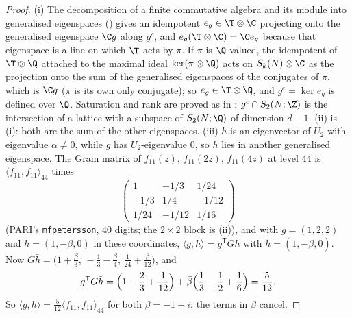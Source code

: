 \begin{proof}
(i) The decomposition of a finite commutative algebra and its module into generalised eigenspaces () gives an idempotent $e_g\in\T\otimes\C$ projecting onto the
generalised eigenspace $\C g$ along $g^c$, and $e_g(\T\otimes\C)=\C e_g$ because that eigenspace is a line on which $\T$ acts by $\pi$. If $\pi$ is $\Q$-valued, the idempotent of $\T\otimes\Q$
attached to the maximal ideal $\ker(\pi\otimes\Q)$ acts on $S_k(N)\otimes\C$ as the projection onto the sum of the generalised eigenspaces of the conjugates of $\pi$, which is $\C g$ ($\pi$
is its own only conjugate); so $e_g\in\T\otimes\Q$, and $g^c=\ker e_g$ is defined over $\Q$. Saturation and rank are proved as in : $g^c\cap S_2(N;\Z)$ is the
intersection of a lattice with a subspace of $S_2(N;\Q)$ of dimension $d-1$. (ii) is
(i): both are the sum of the other eigenspaces. (iii) $h$ is an eigenvector of $U_2$ with eigenvalue $\alpha\ne0$, while $g$ has $U_2$-eigenvalue $0$, so $h$
lies in another generalised eigenspace. The Gram matrix of $f_{11}(z)$, $f_{11}(2z)$, $f_{11}(4z)$ at level $44$ is $\langle f_{11},f_{11}\rangle_{44}$ times
\[
\begin{pmatrix}1&-1/3&1/24\\-1/3&1/4&-1/12\\1/24&-1/12&1/16\end{pmatrix}
\]
(PARI's \texttt{mfpetersson}, $40$ digits; the $2\times2$ block is (ii)), and with $g=(1,2,2)$ and $h=(1,-\beta,0)$ in these coordinates,
$\langle g,h\rangle=g^{\mathsf T}G\bar h$ with $\bar h=(1,-\bar\beta,0)$. Now $G\bar h=\bigl(1+\frac{\bar\beta}3,\,-\frac13-\frac{\bar\beta}4,\,\frac1{24}+\frac{\bar\beta}{12}\bigr)$, and
\[
g^{\mathsf T}G\bar h=\Bigl(1-\frac23+\frac1{12}\Bigr)+\bar\beta\Bigl(\frac13-\frac12+\frac16\Bigr)=\frac5{12}.
\]
So $\langle g,h\rangle=\frac5{12}\langle f_{11},f_{11}\rangle_{44}$ for both $\beta=-1\pm i$: the terms in $\beta$ cancel.
\end{proof}

